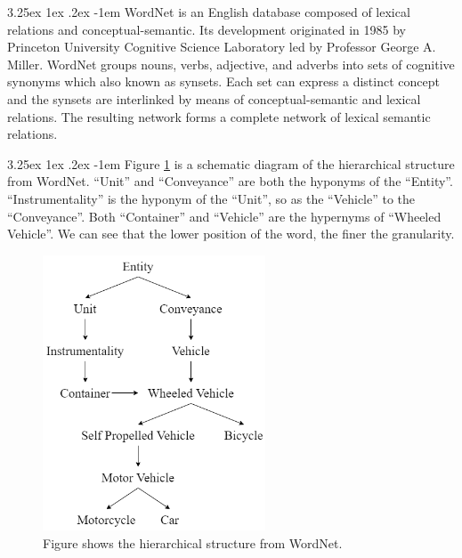 \documentclass[12pt]{article}
\makeatletter
\renewcommand\paragraph{\@startsection{paragraph}{5}{\z@}%
  {3.25ex \@plus1ex \@minus.2ex}%
  {-1em}%
  {\normalfont\normalsize\bfseries}}
\makeatother
\begin{document}
\begin{CJK*}{UTF8}{bkai}
\begin{spacing}{1.77}
\paragraph{}
WordNet \cite{wordnet} is an English database composed of lexical relations and conceptual-semantic. Its development originated in 1985 by Princeton University Cognitive Science Laboratory led by Professor George A. Miller. WordNet groups nouns, verbs, adjective, and adverbs into sets of cognitive synonyms which also known as synsets. Each set can express a distinct concept and the synsets are interlinked by means of conceptual-semantic and lexical relations. The resulting network forms a complete network of lexical semantic relations.

\paragraph{}
Figure \ref{fig:wordnet} is a schematic diagram of the hierarchical structure from WordNet. ``Unit'' and ``Conveyance'' are both the hyponyms of the ``Entity''. ``Instrumentality'' is the hyponym of the ``Unit'', so as the ``Vehicle'' to the ``Conveyance''. Both ``Container'' and ``Vehicle'' are the hypernyms of ``Wheeled Vehicle''. We can see that the lower position of the word, the finer the granularity.

\begin{figure}[H]
  \centering
  \includegraphics[width=250px]{WordNet.png}
  \caption[Hierarchical Structure of WordNet]{Figure shows the hierarchical structure from WordNet.}
  \label{fig:wordnet}
\end{figure}


\end{spacing}
\end{CJK*}
\end{document}
